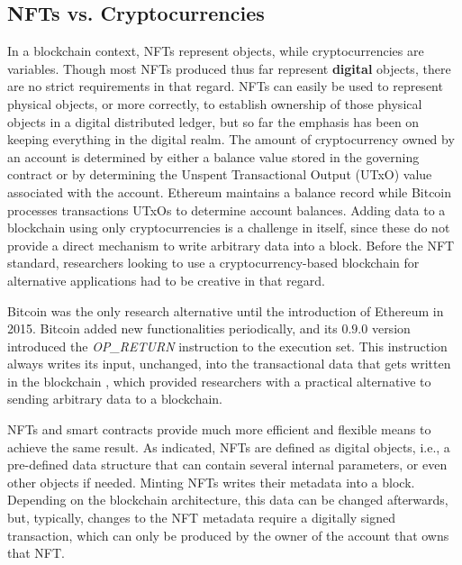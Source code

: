 \documentclass[../3_VotingAndNFTs.tex]{subfiles}
\begin{document}
\subsection{NFTs vs. Cryptocurrencies}
In a blockchain context, NFTs represent objects, while cryptocurrencies are variables. Though most NFTs produced thus far represent \textbf{digital} objects, there are no strict requirements in that regard. NFTs can easily be used to represent physical objects, or more correctly, to establish ownership of those physical objects in a digital distributed ledger, but so far the emphasis has been on keeping everything in the digital realm. The amount of cryptocurrency owned by an account is determined by either a balance value stored in the governing contract or by determining the Unspent Transactional Output (UTxO) value associated with the account. Ethereum maintains a balance record while Bitcoin processes transactions UTxOs to determine account balances. Adding data to a blockchain using only cryptocurrencies is a challenge in itself, since these do not provide a direct mechanism to write arbitrary data into a block. Before the NFT standard, researchers looking to use a cryptocurrency-based blockchain for alternative applications had to be creative in that regard.
\par
Bitcoin was the only research alternative until the introduction of Ethereum in 2015. Bitcoin added new functionalities periodically, and its $0.9.0$ version introduced the \textit{OP\_RETURN} instruction to the execution set. This instruction always writes its input, unchanged, into the transactional data that gets written in the blockchain \cite{Bartoletti2017}, which provided researchers with a practical alternative to sending arbitrary data to a blockchain.
\par
NFTs and smart contracts provide much more efficient and flexible means to achieve the same result. As indicated, NFTs are defined as digital objects, i.e., a pre-defined data structure that can contain several internal parameters, or even other objects if needed. Minting NFTs writes their metadata into a block. Depending on the blockchain architecture, this data can be changed afterwards, but, typically, changes to the NFT metadata require a digitally signed transaction, which can only be produced by the owner of the account that owns that NFT.
\end{document}
